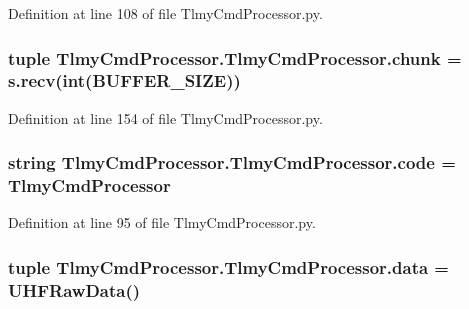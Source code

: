 Definition at line 108 of file Tlmy\+Cmd\+Processor.\+py.

\hypertarget{namespace_tlmy_cmd_processor_1_1_tlmy_cmd_processor_a1ed237493e0f74a1a922ee4b54ef0657}{}
\subsubsection[{chunk}]{\setlength{\rightskip}{0pt plus 5cm}tuple Tlmy\+Cmd\+Processor.\+Tlmy\+Cmd\+Processor.\+chunk = s.\+recv(int({\bf B\+U\+F\+F\+E\+R\+\_\+\+S\+I\+Z\+E}))}\label{namespace_tlmy_cmd_processor_1_1_tlmy_cmd_processor_a1ed237493e0f74a1a922ee4b54ef0657}


Definition at line 154 of file Tlmy\+Cmd\+Processor.\+py.

\hypertarget{namespace_tlmy_cmd_processor_1_1_tlmy_cmd_processor_a4b093dcc82bbec72c8869f3715934d92}{}
\subsubsection[{code}]{\setlength{\rightskip}{0pt plus 5cm}string Tlmy\+Cmd\+Processor.\+Tlmy\+Cmd\+Processor.\+code = \textquotesingle{}Tlmy\+Cmd\+Processor\textquotesingle{}}\label{namespace_tlmy_cmd_processor_1_1_tlmy_cmd_processor_a4b093dcc82bbec72c8869f3715934d92}


Definition at line 95 of file Tlmy\+Cmd\+Processor.\+py.

\hypertarget{namespace_tlmy_cmd_processor_1_1_tlmy_cmd_processor_aa2dfd09891072d77d04b841a8bed1462}{}
\subsubsection[{data}]{\setlength{\rightskip}{0pt plus 5cm}tuple Tlmy\+Cmd\+Processor.\+Tlmy\+Cmd\+Processor.\+data = {\bf U\+H\+F\+Raw\+Data}()}\label{namespace_tlmy_cmd_processor_1_1_tlmy_cmd_processor_aa2dfd09891072d77d04b841a8bed1462}


